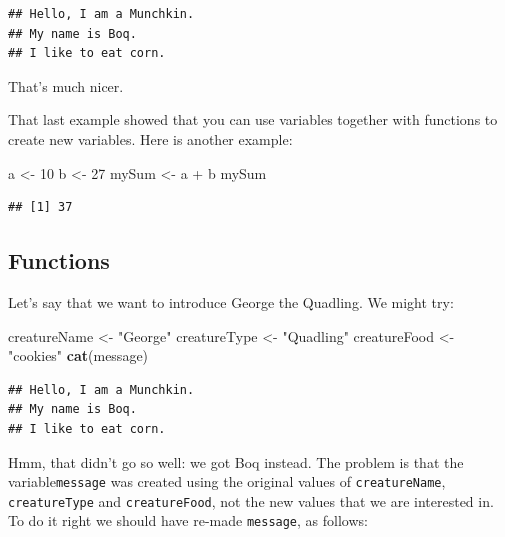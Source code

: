 \documentclass[]{book}
\makeatletter
\newenvironment{Shaded}{\begin{snugshade}}{\end{snugshade}}
\newcommand{\KeywordTok}[1]{\textcolor[rgb]{0.13,0.29,0.53}{\textbf{{#1}}}}
\newcommand{\DecValTok}[1]{\textcolor[rgb]{0.00,0.00,0.81}{{#1}}}
\newcommand{\StringTok}[1]{\textcolor[rgb]{0.31,0.60,0.02}{{#1}}}
\newcommand{\NormalTok}[1]{{#1}}
\newenvironment{kframe}{%
\medskip{}
\setlength{\fboxsep}{.8em}
 \def\at@end@of@kframe{}%
 \ifinner\ifhmode%
  \def\at@end@of@kframe{\end{minipage}}%
  \begin{minipage}{\columnwidth}%
 \fi\fi%
 \def\FrameCommand##1{\hskip\@totalleftmargin \hskip-\fboxsep
 \colorbox{shadecolor}{##1}\hskip-\fboxsep
     \hskip-\linewidth \hskip-\@totalleftmargin \hskip\columnwidth}%
 \MakeFramed {\advance\hsize-\width
   \@totalleftmargin\z@ \linewidth\hsize
   \@setminipage}}%
 {\par\unskip\endMakeFramed%
 \at@end@of@kframe}
\renewenvironment{Shaded}{\begin{kframe}}{\end{kframe}}
\theoremstyle{definition}
\theoremstyle{definition}
\theoremstyle{remark}
\makeatother
\begin{document}
\begin{verbatim}
## Hello, I am a Munchkin.
## My name is Boq.
## I like to eat corn.
\end{verbatim}

That's much nicer.

That last example showed that you can use variables together with
functions to create new variables. Here is another example:

\begin{Shaded}
\begin{Highlighting}[]
\NormalTok{a <-}\StringTok{ }\DecValTok{10}
\NormalTok{b <-}\StringTok{ }\DecValTok{27}
\NormalTok{mySum <-}\StringTok{ }\NormalTok{a +}\StringTok{ }\NormalTok{b}
\NormalTok{mySum}
\end{Highlighting}
\end{Shaded}

\begin{verbatim}
## [1] 37
\end{verbatim}

\subsection{Functions}\label{idea-functions}

Let's say that we want to introduce George the Quadling. We might try:

\begin{Shaded}
\begin{Highlighting}[]
\NormalTok{creatureName <-}\StringTok{ "George"}
\NormalTok{creatureType <-}\StringTok{ "Quadling"}
\NormalTok{creatureFood <-}\StringTok{ "cookies"}
\KeywordTok{cat}\NormalTok{(message)}
\end{Highlighting}
\end{Shaded}

\begin{verbatim}
## Hello, I am a Munchkin.
## My name is Boq.
## I like to eat corn.
\end{verbatim}

Hmm, that didn't go so well: we got Boq instead. The problem is that the
variable\texttt{message} was created using the original values of
\texttt{creatureName}, \texttt{creatureType} and \texttt{creatureFood},
not the new values that we are interested in. To do it right we should
have re-made \texttt{message}, as follows:
\end{document}
